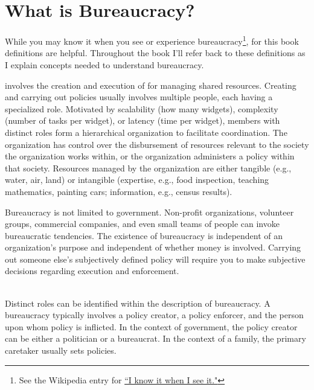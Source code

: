 \section{What is Bureaucracy?\label{sec:define-bureaucracy}}

While you may know it when you see or experience bureaucracy\footnote{See the Wikipedia entry for \href{https://en.wikipedia.org/wiki/I_know_it_when_I_see_it}{``I know it when I see it."}}, for this book definitions are helpful. Throughout the book I'll refer back to these definitions as I explain concepts needed to understand bureaucracy.

\iftoggle{glossaryinmargin}{\marginpar{[Glossary]}}{}
\iftoggle{glossarysubstitutionworks}{\Gls{bureaucracy}}{Bureaucracy} involves the creation and execution of 
\iftoggle{glossarysubstitutionworks}{\glspl{policy}}{policies} for managing shared resources. 
Creating and carrying out policies usually involves multiple people, each having a specialized role. Motivated by scalability (how many widgets), complexity (number of tasks per widget), or latency (time per widget), members with distinct roles form a hierarchical organization to facilitate coordination. The organization has control over the disbursement of resources relevant to the society the organization works within, or the organization administers a policy within that society. Resources managed by the organization are either tangible (e.g., water, air, land) or intangible (expertise, e.g., food inspection, teaching mathematics, painting cars; information, e.g., census results).  

Bureaucracy is not limited to government. Non-profit organizations, volunteer groups, commercial companies, and even small teams of people can invoke bureaucratic tendencies. The existence of bureaucracy is independent of an organization's purpose and independent of whether money is involved. Carrying out someone else's subjectively defined policy will require you to make subjective decisions regarding execution and enforcement. 

\ \\

Distinct roles can be identified within the description of bureaucracy.
A bureaucracy typically involves a policy creator, a policy enforcer, and the person upon whom policy is inflicted. In the context of government, the policy creator can be either a politician or a bureaucrat. In the context of a family, the primary caretaker usually sets policies.

